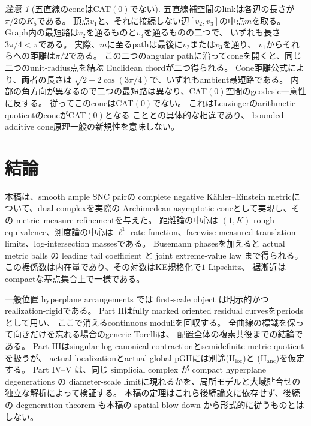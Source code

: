 \documentclass[11pt,a4paper]{ltjsarticle}
\theoremstyle{plain}
\theoremstyle{definition}
\theoremstyle{remark}
\newtheorem{remark}[remark]{注意}
\begin{document}
\begin{remark}[五直線のconeはCAT$(0)$でない]
\label{rem:K5-not-CAT0}
五直線補空間のlinkは各辺の長さが$\pi/2$の$K_5$である。
頂点$v_1$と、それに接続しない辺$[v_2,v_3]$の中点$m$を取る。
Graph内の最短路は$v_2$を通るものと$v_3$を通るものの二つで、
いずれも長さ$3\pi/4<\pi$である。
実際、$m$に至るpathは最後に$v_2$または$v_3$を通り、
$v_1$からそれらへの距離は$\pi/2$である。
この二つのangular pathに沿ってconeを開くと、同じ二つのunit-radius点を結ぶ
Euclidean chordが二つ得られる。
Cone距離公式により、両者の長さは
$\sqrt{2-2\cos(3\pi/4)}$で、いずれもambient最短路である。
内部の角方向が異なるので二つの最短路は異なり、CAT$(0)$空間のgeodesic一意性に反する。
従ってこのconeはCAT$(0)$でない。
これはLeuzingerのarithmetic quotientのconeがCAT$(0)$となる
\cite[Corollary~5.5]{Leuzinger}こととの具体的な相違であり、
bounded-additive cone原理一般の新規性を意味しない。
\end{remark}

\section{結論}
本稿は、smooth ample SNC pairの complete negative K\"ahler--Einstein metricについて、dual complexを実際の Archimedean asymptotic coneとして実現し、その metric--measure refinementを与えた。
距離論の中心は $(1,K)$-rough equivalence、測度論の中心は $\ell^1$ rate function、facewise measured translation limits、log-intersection massesである。
Busemann phasesを加えると actual metric balls の leading tail coefficient と joint extreme-value law まで得られる。
この裾係数は内在量であり、その対数はKE規格化で$1$-Lipschitz、
裾漸近はcompactな基点集合上で一様である。

一般位置 hyperplane arrangements では first-scale object は明示的かつ realization-rigidである。
Part IIはfully marked oriented residual curvesをperiodsとして用い、
ここで消えるcontinuous moduliを回収する。
全曲線の標識を保って向きだけを忘れる場合のgeneric Torelliは、
配置全体の複素共役までの結論である\cite{UedaII}。
Part IIIはsingular log-canonical contractionとsemidefinite metric quotientを扱うが、
actual localizationとactual global pGHには別途(H$_{\mathrm{loc}}$)と
(H$_{\mathrm{anc}}$)を仮定する。
Part IV--V は、同じ simplicial complex が compact hyperplane degenerations の diameter-scale limitに現れるかを、局所モデルと大域貼合せの独立な解析によって検証する。
本稿の定理はこれら後続論文に依存せず、後続の degeneration theorem も本稿の spatial blow-down から形式的に従うものとはしない。
\end{document}
